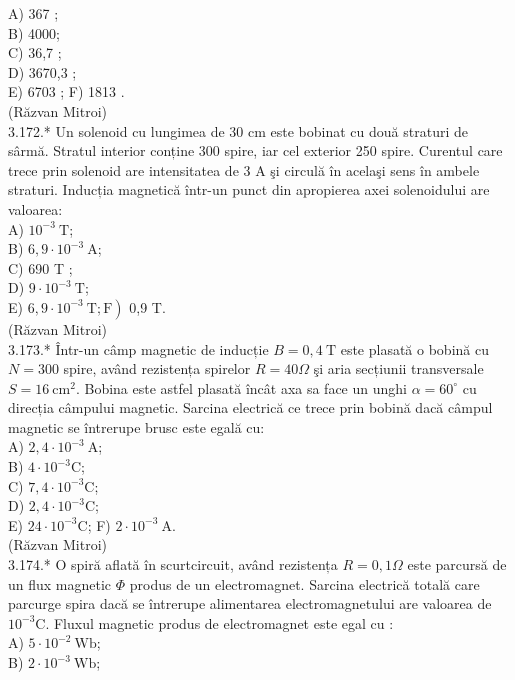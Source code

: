 \documentclass[10pt]{article}
\begin{document}
A) 367 ;\\
B) 4000;\\
C) 36,7 ;\\
D) 3670,3 ;\\
E) 6703 ; F) 1813 .\\
(Răzvan Mitroi)\\
3.172.* Un solenoid cu lungimea de 30 cm este bobinat cu două straturi de sârmă. Stratul interior conține 300 spire, iar cel exterior 250 spire. Curentul care trece prin solenoid are intensitatea de 3 A şi circulă în acelaşi sens în ambele straturi. Inducția magnetică într-un punct din apropierea axei solenoidului are valoarea:\\
A) $10^{-3} \mathrm{~T}$;\\
B) $6,9 \cdot 10^{-3} \mathrm{~A}$;\\
C) 690 T ;\\
D) $9 \cdot 10^{-3} \mathrm{~T}$;\\
E) $\left.6,9 \cdot 10^{-3} \mathrm{~T} ; \mathrm{F}\right)$ 0,9 T.\\
(Răzvan Mitroi)\\
3.173.* Într-un câmp magnetic de inducție $B=0,4 \mathrm{~T}$ este plasată o bobină cu $N=300$ spire, având rezistența spirelor $R=40 \Omega$ şi aria secțiunii transversale $S=16 \mathrm{~cm}^{2}$. Bobina este astfel plasată încât axa sa face un unghi $\alpha=60^{\circ}$ cu direcția câmpului magnetic. Sarcina electrică ce trece prin bobină dacă câmpul magnetic se întrerupe brusc este egală cu:\\
A) $2,4 \cdot 10^{-3} \mathrm{~A}$;\\
B) $4 \cdot 10^{-3} \mathrm{C}$;\\
C) $7,4 \cdot 10^{-3} \mathrm{C}$;\\
D) $2,4 \cdot 10^{-3} \mathrm{C}$;\\
E) $24 \cdot 10^{-3} \mathrm{C}$; F) $2 \cdot 10^{-3} \mathrm{~A}$.\\
(Răzvan Mitroi)\\
3.174.* O spiră aflată în scurtcircuit, având rezistența $R=0,1 \Omega$ este parcursă de un flux magnetic $\Phi$ produs de un electromagnet. Sarcina electrică totală care\\
parcurge spira dacă se întrerupe alimentarea electromagnetului are valoarea de $10^{-3} \mathrm{C}$. Fluxul magnetic produs de electromagnet este egal cu :\\
A) $5 \cdot 10^{-2} \mathrm{~Wb}$;\\
B) $2 \cdot 10^{-3} \mathrm{~Wb}$;\\
\end{document}
